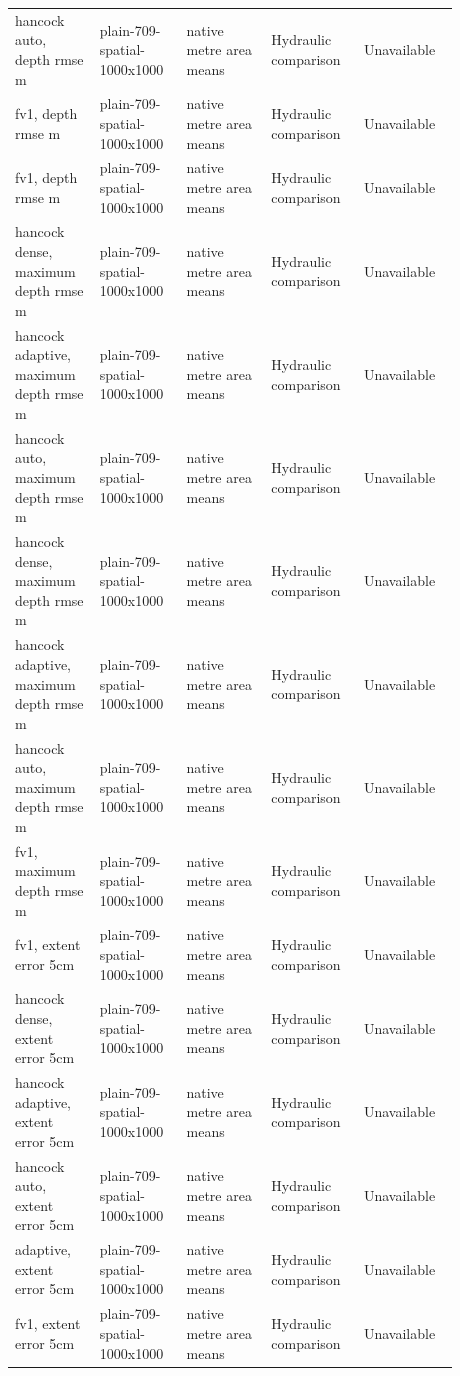 \begin{longtable}{p{0.1760\linewidth}p{0.1760\linewidth}p{0.1760\linewidth}p{0.1760\linewidth}p{0.1760\linewidth}}
hancock auto, depth rmse m & plain-709-spatial-1000x1000 & native metre area means & Hydraulic comparison & Unavailable \\
fv1, depth rmse m & plain-709-spatial-1000x1000 & native metre area means & Hydraulic comparison & Unavailable \\
fv1, depth rmse m & plain-709-spatial-1000x1000 & native metre area means & Hydraulic comparison & Unavailable \\
hancock dense, maximum depth rmse m & plain-709-spatial-1000x1000 & native metre area means & Hydraulic comparison & Unavailable \\
hancock adaptive, maximum depth rmse m & plain-709-spatial-1000x1000 & native metre area means & Hydraulic comparison & Unavailable \\
hancock auto, maximum depth rmse m & plain-709-spatial-1000x1000 & native metre area means & Hydraulic comparison & Unavailable \\
hancock dense, maximum depth rmse m & plain-709-spatial-1000x1000 & native metre area means & Hydraulic comparison & Unavailable \\
hancock adaptive, maximum depth rmse m & plain-709-spatial-1000x1000 & native metre area means & Hydraulic comparison & Unavailable \\
hancock auto, maximum depth rmse m & plain-709-spatial-1000x1000 & native metre area means & Hydraulic comparison & Unavailable \\
fv1, maximum depth rmse m & plain-709-spatial-1000x1000 & native metre area means & Hydraulic comparison & Unavailable \\
fv1, extent error 5cm & plain-709-spatial-1000x1000 & native metre area means & Hydraulic comparison & Unavailable \\
hancock dense, extent error 5cm & plain-709-spatial-1000x1000 & native metre area means & Hydraulic comparison & Unavailable \\
hancock adaptive, extent error 5cm & plain-709-spatial-1000x1000 & native metre area means & Hydraulic comparison & Unavailable \\
hancock auto, extent error 5cm & plain-709-spatial-1000x1000 & native metre area means & Hydraulic comparison & Unavailable \\
adaptive, extent error 5cm & plain-709-spatial-1000x1000 & native metre area means & Hydraulic comparison & Unavailable \\
fv1, extent error 5cm & plain-709-spatial-1000x1000 & native metre area means & Hydraulic comparison & Unavailable \\

\end{longtable}
